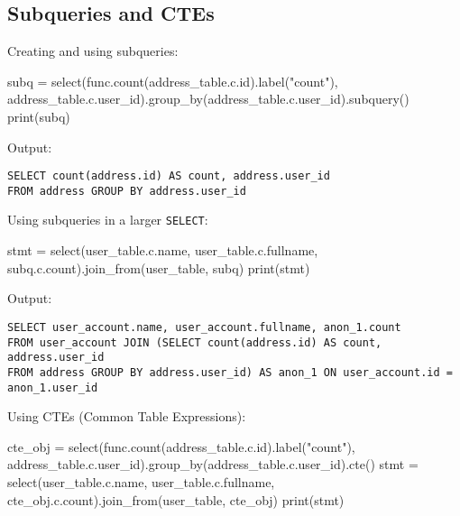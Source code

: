 \documentclass[
  letterpaper,
  DIV=11,
  numbers=noendperiod]{scrreprt}
\newenvironment{Shaded}{\begin{snugshade}}{\end{snugshade}}
\newcommand{\BuiltInTok}[1]{\textcolor[rgb]{0.00,0.23,0.31}{#1}}
\newcommand{\NormalTok}[1]{\textcolor[rgb]{0.00,0.23,0.31}{#1}}
\newcommand{\OperatorTok}[1]{\textcolor[rgb]{0.37,0.37,0.37}{#1}}
\newcommand{\StringTok}[1]{\textcolor[rgb]{0.13,0.47,0.30}{#1}}
\begin{document}
\subsection{Subqueries and CTEs}\label{subqueries-and-ctes}

Creating and using subqueries:

\begin{Shaded}
\begin{Highlighting}[]
\NormalTok{subq }\OperatorTok{=}\NormalTok{ select(func.count(address\_table.c.}\BuiltInTok{id}\NormalTok{).label(}\StringTok{"count"}\NormalTok{), address\_table.c.user\_id).group\_by(address\_table.c.user\_id).subquery()}
\BuiltInTok{print}\NormalTok{(subq)}
\end{Highlighting}
\end{Shaded}

Output:

\begin{verbatim}
SELECT count(address.id) AS count, address.user_id
FROM address GROUP BY address.user_id
\end{verbatim}

Using subqueries in a larger \texttt{SELECT}:

\begin{Shaded}
\begin{Highlighting}[]
\NormalTok{stmt }\OperatorTok{=}\NormalTok{ select(user\_table.c.name, user\_table.c.fullname, subq.c.count).join\_from(user\_table, subq)}
\BuiltInTok{print}\NormalTok{(stmt)}
\end{Highlighting}
\end{Shaded}

Output:

\begin{verbatim}
SELECT user_account.name, user_account.fullname, anon_1.count
FROM user_account JOIN (SELECT count(address.id) AS count, address.user_id
FROM address GROUP BY address.user_id) AS anon_1 ON user_account.id = anon_1.user_id
\end{verbatim}

Using CTEs (Common Table Expressions):

\begin{Shaded}
\begin{Highlighting}[]
\NormalTok{cte\_obj }\OperatorTok{=}\NormalTok{ select(func.count(address\_table.c.}\BuiltInTok{id}\NormalTok{).label(}\StringTok{"count"}\NormalTok{), address\_table.c.user\_id).group\_by(address\_table.c.user\_id).cte()}
\NormalTok{stmt }\OperatorTok{=}\NormalTok{ select(user\_table.c.name, user\_table.c.fullname, cte\_obj.c.count).join\_from(user\_table, cte\_obj)}
\BuiltInTok{print}\NormalTok{(stmt)}
\end{Highlighting}
\end{Shaded}
\end{document}
